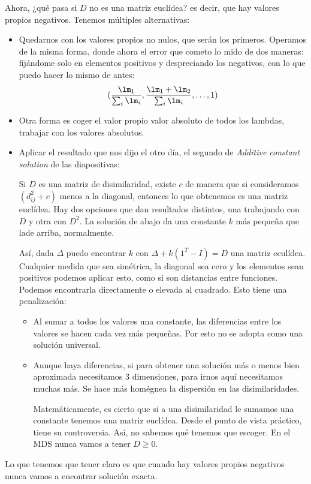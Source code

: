 \noindent
Ahora, ¿qué pasa si $D$ no es una matriz euclídea? es decir, que hay valores propios negativos. Tenemos múltiples alternativas:
\begin{itemize}
    \item Quedarnos con los valores propios no nulos, que serán los primeros. Operamos de la misma forma, donde ahora el error que cometo lo mido de dos maneras: fijándome solo en elementos positivos y despreciando los negativos, con lo que puedo hacer lo mismo de antes:
        \begin{equation*}
            (\frac{\lm_1}{\sum_{i} \lm_i}, \frac{\lm_1+\lm_2}{\sum_{i} \lm_i}, \ldots, 1)
        \end{equation*}
    \item Otra forma es coger el valor propio valor absoluto de todos los lambdas, trabajar con los valores absolutos.
    \item Aplicar el resultado que nos dijo el otro día, el segundo de \textit{Additive constant solution} de las diapositivas:

        Si $D$ es una matriz de disimilaridad, existe $c$ de manera que si consideramos $(d_{ij}^2 + c)$ menos a la diagonal, entonces lo que obtenemos es una matriz euclídea. Hay dos opciones que dan resultados distintos, una trabajando con $D$ y otra con $D^2$. La solución de abajo da una constante $k$ más pequeña que lade arriba, normalmente.

        Así, dada $\Delta$ puedo encontrar $k$ con $\Delta + k(1^T - I) = D$ una matriz eculídea.  Cualquier medida que sea simétrica, la diagonal sea cero y los elementos sean positivos podemos aplicar esto, como si son distancias entre funciones. Podemos encontrarla directamente o elevada al cuadrado. Esto tiene una penalización:
        \begin{itemize}
            \item Al sumar a todos los valores una constante, las diferencias entre los valores se hacen cada vez más pequeñas. Por esto no se adopta como una solución universal.
            \item Aunque haya diferencias, si para obtener una solución más o menos bien aproximada necesitamos 3 dimensiones, para irnos aquí necesitamos muchas más. Se hace más homégnea la dispersión en las disimilaridades.

                Matemáticamente, es cierto que si a una disimilaridad le sumamos una constante tenemos una matriz euclídea. Desde el punto de vista práctico, tiene su controversia. Así, no sabemos qué tenemos que escoger. En el MDS nunca vamos a tener $D\geq 0$.
        \end{itemize}
\end{itemize}
Lo que tenemos que tener claro es que cuando hay valores propios negativos nunca vamos a encontrar solución exacta.\\

